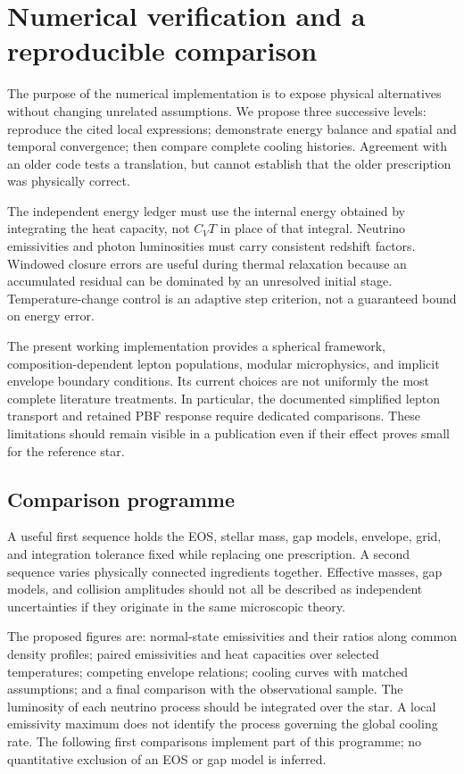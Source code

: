 \documentclass{aa}
\begin{document}
\section{Numerical verification and a reproducible comparison}
The purpose of the numerical implementation is to expose physical alternatives without changing unrelated assumptions. We propose three successive levels: reproduce the cited local expressions; demonstrate energy balance and spatial and temporal convergence; then compare complete cooling histories. Agreement with an older code tests a translation, but cannot establish that the older prescription was physically correct.

The independent energy ledger must use the internal energy obtained by integrating the heat capacity, not $C_VT$ in place of that integral. Neutrino emissivities and photon luminosities must carry consistent redshift factors. Windowed closure errors are useful during thermal relaxation because an accumulated residual can be dominated by an unresolved initial stage. Temperature-change control is an adaptive step criterion, not a guaranteed bound on energy error.

The present working implementation provides a spherical framework, composition-dependent lepton populations, modular microphysics, and implicit envelope boundary conditions. Its current choices are not uniformly the most complete literature treatments. In particular, the documented simplified lepton transport and retained PBF response require dedicated comparisons. These limitations should remain visible in a publication even if their effect proves small for the reference star.

\subsection{Comparison programme}
A useful first sequence holds the EOS, stellar mass, gap models, envelope, grid, and integration tolerance fixed while replacing one prescription. A second sequence varies physically connected ingredients together. Effective masses, gap models, and collision amplitudes should not all be described as independent uncertainties if they originate in the same microscopic theory.

The proposed figures are: normal-state emissivities and their ratios along common density profiles; paired emissivities and heat capacities over selected temperatures; competing envelope relations; cooling curves with matched assumptions; and a final comparison with the observational sample. The luminosity of each neutrino process should be integrated over the star. A local emissivity maximum does not identify the process governing the global cooling rate. The following first comparisons implement part of this programme; no quantitative exclusion of an EOS or gap model is inferred.
\end{document}
